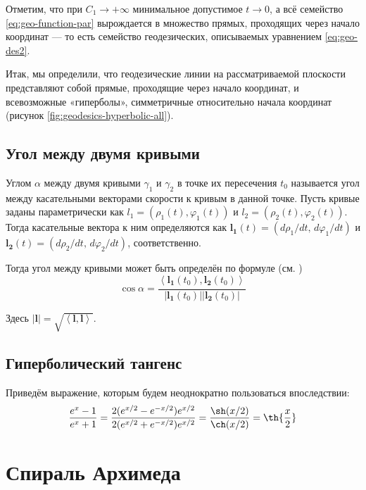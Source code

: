 \documentclass{article}
\numberwithin{equation}{section}
\renewcommand{\phi}{\varphi}
\newcommand{\scalmult}[2]{{\left \langle #1 \right \rangle}_{#2}}
\renewcommand{\vec}{\mathbf}
\providecommand{\abs}[1]{\left \lvert{#1}\right \rvert}
\begin{document}
Отметим, что при $C_1 \to +\infty$ минимальное допустимое $t \to 0$, а
всё семейство \eqref{eq:geo-function-par} вырождается в множество
прямых, проходящих через начало координат — то есть семейство
геодезических, описываемых уравнением \eqref{eq:geo-des2}.



Итак, мы определили, что геодезические линии на рассматриваемой
плоскости представляют собой прямые, проходящие через начало
координат, и всевозможные «гиперболы», симметричные относительно
начала координат (рисунок \ref{fig:geodesics-hyperbolic-all}).

\clearpage

\subsection{Угол между двумя кривыми}

Углом $\alpha$ между двумя кривыми $\gamma_1$ и $\gamma_2$ в точке их
пересечения $t_0$ называется угол между касательными векторами
скорости к кривым в данной точке. Пусть кривые заданы параметрически
как $l_1 = (\rho_1(t), \phi_1(t))$ и $l_2 = (\rho_2(t), \phi_2(t))$.
Тогда касательные вектора к ним определяются как $\vec{l_1}(t) =
(d\rho_1/dt,\,d\phi_1/dt)$ и $\vec{l_2}(t) =
(d\rho_2/dt,\,d{\phi_2}/dt)$, соответственно.

Тогда угол между
кривыми может быть определён по формуле (см. \cite{dubrovin98})
\begin{equation}\label{eq:curves-angle}
  \cos \alpha = \frac{\scalmult{\vec{l_1}(t_0), \vec{l_2}(t_0)}{}}{\abs{\vec{l_1}(t_0)} \abs{\vec{l_2}(t_0)}}
\end{equation}

Здесь $\abs{\vec{l}} = \sqrt{\scalmult{\vec{l},\vec{l}}{}}$.

\subsection{Гиперболический тангенс}

Приведём выражение, которым будем неоднократно пользоваться впоследствии:
\begin{equation}\label{eq:tanh}
  \frac{e^x-1}{e^x+1} =
  \frac{2(e^{x/2}-e^{-x/2})e^{x/2}}{2(e^{x/2}+e^{-x/2})e^{x/2}}
  = \frac{\sh(x/2)}{\ch(x/2)} = \th{\frac{x}{2}}
\end{equation}

\clearpage

\section{Спираль Архимеда}
\end{document}
